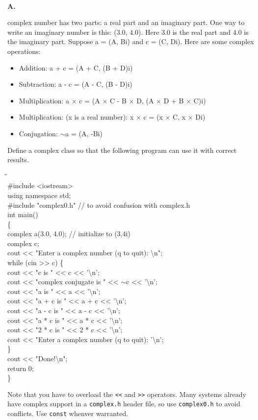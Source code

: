 \documentclass[10 pt]{amsart}
\newlength{\cwidth}
\newenvironment{cpart}[2][\cwidth]
	{%
		\\ %
		\textbf{#2. }%
		\begin{minipage}[t]{#1}%
		\setlength{\parindent}{0pt}%
		\setlength{\parskip}{2ex}%
	}
	{%
		\end{minipage}%
	}
\newcommand{\ttt}[1]{\texttt{#1}}
\newcommand{\tbs}{\textbackslash}
\begin{document}
	\begin{cpart}{7}
		A complex number has two parts: a real part and an imaginary
		part. 
		One way to write an imaginary number is this: (3.0, 4.0).
		Here 3.0 is the real part and 4.0 is the imaginary part.
		Suppose a = (A, Bi) and c = (C, Di).
		Here are some complex operations: 
		\begin{itemize}
			\item Addition: a + c = (A + C, (B + D)i)
			\item Subtraction: a - c = (A - C, (B - D)i) 
			\item Multiplication: 
				a $\times$ c = (A $\times$ C - B $\times$ D, 
									(A $\times$ D + B $\times$ C)i)
			\item Multiplication: (x is a real number): 
						x $\times$ c = (x $\times$ C, x $\times$ Di)
			\item Conjugation: $\sim$a = (A, -Bi)
		\end{itemize}

		Define a complex class so that the following program can
		use it with correct results.
		{\ttfamily
			\begin{tabbing}
				\phantom{\qquad}\=\phantom{\qquad}\=\phantom{\qquad}\= \\
				\#include <iostream> \\
				using namespace std; \\
				\#include "complex0.h"  // to avoid confusion with complex.h \\
				int main() \\
				\{
				\+ \\
				complex a(3.0, 4.0);  // initialize to (3,4i) \\
				complex c; \\
				cout << "Enter a complex number (q to quit):
							\textbackslash n"; \\
				while (cin >> c)
				\{ 
				\+ \\
				cout << "c is " << c << '\textbackslash n'; \\
				cout << "complex conjugate is " << $\sim$c << '\tbs n'; \\
				cout << "a is " << a << '\tbs n'; \\
				cout << "a + c is " << a + c << '\tbs n'; \\
				cout << "a - c is " << a - c << '\tbs n'; \\
				cout << "a * c is " << a * c << '\tbs n'; \\
				cout << "2 * c is " << 2 * c << '\tbs n'; \\
				cout << "Enter a complex number (q to quit): '\tbs n';
				\- \\
				\} \\
				cout << "Done!\tbs n"; \\
				return 0;
				\- \\
				\}
			\end{tabbing}
		}		
		Note that you have to overload the \ttt{<<} and \ttt{>>}
		operators.
		Many systems already have complex support in a \ttt{complex.h}
		header file, so use \ttt{complex0.h} to avoid conflicts.
		Use \ttt{const} whenver warranted.
	\end{cpart}
	\newpage
\end{document}
